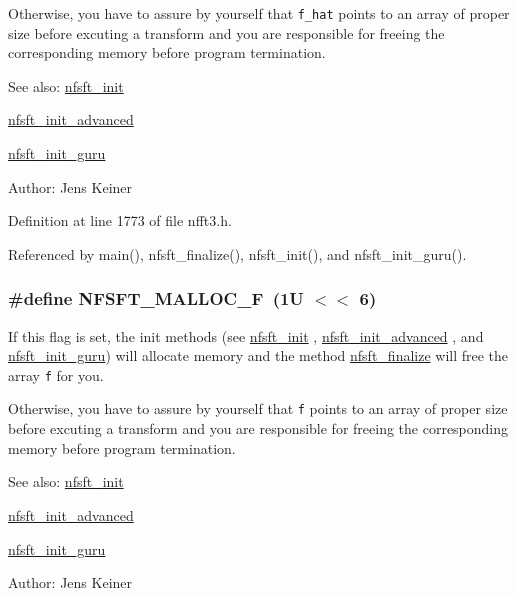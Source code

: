 Otherwise, you have to assure by yourself that {\tt f\_\-hat} points to an array of proper size before excuting a transform and you are responsible for freeing the corresponding memory before program termination.

\begin{Desc}
\item[See also:]\hyperlink{group__nfsft_ga1}{nfsft\_\-init} 

\hyperlink{group__nfsft_ga2}{nfsft\_\-init\_\-advanced} 

\hyperlink{group__nfsft_ga3}{nfsft\_\-init\_\-guru} \end{Desc}
\begin{Desc}
\item[Author:]Jens Keiner \end{Desc}


Definition at line 1773 of file nfft3.h.

Referenced by main(), nfsft\_\-finalize(), nfsft\_\-init(), and nfsft\_\-init\_\-guru().\hypertarget{group__nfsft_ga30}{
\subsubsection[NFSFT\_\-MALLOC\_\-F]{\setlength{\rightskip}{0pt plus 5cm}\#define NFSFT\_\-MALLOC\_\-F~(1U $<$$<$ 6)}}
\label{group__nfsft_ga30}


If this flag is set, the init methods (see \hyperlink{group__nfsft_ga1}{nfsft\_\-init} , \hyperlink{group__nfsft_ga2}{nfsft\_\-init\_\-advanced} , and \hyperlink{group__nfsft_ga3}{nfsft\_\-init\_\-guru}) will allocate memory and the method \hyperlink{group__nfsft_ga10}{nfsft\_\-finalize} will free the array {\tt f} for you. 

Otherwise, you have to assure by yourself that {\tt f} points to an array of proper size before excuting a transform and you are responsible for freeing the corresponding memory before program termination.

\begin{Desc}
\item[See also:]\hyperlink{group__nfsft_ga1}{nfsft\_\-init} 

\hyperlink{group__nfsft_ga2}{nfsft\_\-init\_\-advanced} 

\hyperlink{group__nfsft_ga3}{nfsft\_\-init\_\-guru} \end{Desc}
\begin{Desc}
\item[Author:]Jens Keiner \end{Desc}


